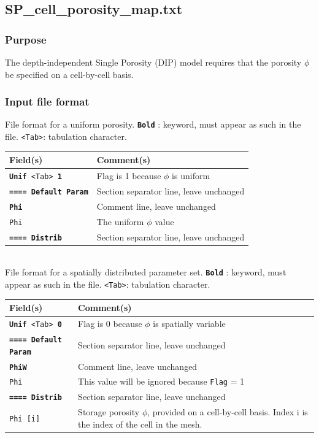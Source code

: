 \subsection{SP\_cell\_porosity\_map.txt}\label{sec_Model!Hyperbolic!SP!cellPorosityMap}
\subsubsection{Purpose}
The depth-independent Single Porosity (DIP) \cite{Guinot_Soares_2006} model requires that the porosity $\phi$ be specified on a cell-by-cell basis.
%
\subsubsection{Input file format}
%
File format for a uniform porosity.  \texttt{\textbf{Bold}} : keyword, must appear as such in the file. \texttt{<Tab>}: tabulation character. \\
    \begin{tabular}{p{6cm} | p{9cm}}
    \hline
    Field(s) & Comment(s) \\
    \hline  \hline
    \texttt{\textbf{Unif} <Tab> \textbf{1}} & Flag is 1 because $\phi$ is uniform \\ \hline
    \texttt{\textbf{==== Default Param}} & Section separator line, leave unchanged \\  \hline
    \texttt{\textbf{Phi}} & Comment line, leave unchanged \\  \hline
    \texttt{Phi}     & The uniform $\phi$ value \\ \hline
    \texttt{\textbf{==== Distrib}} & Section separator line, leave unchanged \\  \hline
    \end{tabular}
%
\vspace{10mm} \\
%
File format for a spatially distributed parameter set.  \texttt{\textbf{Bold}} : keyword, must appear as such in the file. \texttt{<Tab>}: tabulation character. \\
    \begin{tabular}{p{6cm} | p{9cm}}
    \hline
    Field(s) & Comment(s) \\
    \hline  \hline
    \texttt{\textbf{Unif} <Tab> \textbf{0}} & Flag is 0 because $\phi$ is spatially variable \\ \hline
    \texttt{\textbf{==== Default Param}} & Section separator line, leave unchanged \\  \hline
    \texttt{\textbf{PhiW}} & Comment line, leave unchanged \\  \hline
    \texttt{Phi}     & This value will be ignored because \texttt{Flag} = 1 \\ \hline
    \texttt{\textbf{==== Distrib}} & Section separator line, leave unchanged \\  \hline
    \texttt{Phi [i]}      & Storage porosity $\phi$, provided on a cell-by-cell basis. Index i is the index of the cell in the mesh.  \\ \hline
    \end{tabular}
%

